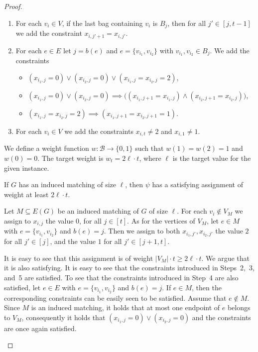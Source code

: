 \begin{proof}
\begin{enumerate}
        \item For each $v_i \in V$, if the last bag containing $v_i$ is $B_j$,
        then for all $j' \in [j,t-1]$ we add the constraint $x_{i,j'+1} = x_{i,j'}$.

        \item For each $e \in E$ let $j=b(e)$ and $e = \{v_{i_1}, v_{i_2}\}$ with $v_{i_1}, v_{i_2} \in B_j$.
        We add the constraints
        \begin{itemize}
            \item $(x_{i_1,j} = 0) \lor (x_{i_2,j} = 0) \lor (x_{i_1,j} = x_{i_2,j} = 2)$,
            \item $(x_{i_1,j} = 0) \lor (x_{i_2,j} = 0) \implies \big((x_{i_1,j+1} = x_{i_1,j}) \land (x_{i_2,j+1} = x_{i_2,j})\big)$,
            \item $(x_{i_1,j} = x_{i_2,j} = 2) \implies (x_{i_1,j+1} = x_{i_2,j+1} = 1)$.
        \end{itemize}

        \item For each $v_i \in V$ we add the constraints $x_{i,t} \neq 2$ and $x_{i,1} \neq 1$.
    \end{enumerate}

    We define a weight function $w \colon \mathcal{B} \to \{0,1\}$ such that
    $w(1) = w(2) = 1$ and $w(0) = 0$.
    The target weight is $w_t = 2\ell \cdot t$,
    where $\ell$ is the target value for the given {\InducedM} instance.

    \begin{claim}
        If $G$ has an induced matching of size $\ell$,
        then $\psi$ has a satisfying assignment of weight at least $2\ell \cdot t$.
    \end{claim}

    \begin{claimproof}
        Let $M \subseteq E(G)$ be an induced matching of $G$ of size $\ell$.
        For each $v_i \notin V_M$ we assign to $x_{i,j}$ the value $0$, for all $j \in [t]$.
        As for the vertices of $V_M$, let $e \in M$ with $e = \{v_{i_1},v_{i_2}\}$ and $b(e)=j$.
        Then we assign to both $x_{i_1,j'},x_{i_2,j'}$ the value $2$ for all $j' \in [j]$,
        and the value $1$ for all $j' \in [j+1,t]$.

        It is easy to see that this assignment is of weight $|V_M| \cdot t \ge 2\ell \cdot t$.
        We argue that it is also satisfying.
        It is easy to see that the constraints introduced in Steps~2,~3, and~5 are satisfied.
        To see that the constraints introduced in Step~4 are also satisfied,
        let $e \in E$ with $e = \{v_{i_1},v_{i_2}\}$ and $b(e)=j$.
        If $e \in M$, then the corresponding constraints can be easily seen to be satisfied.
        Assume that $e \notin M$.
        Since $M$ is an induced matching, it holds that at most one endpoint of $e$ belongs to $V_M$,
        consequently it holds that $(x_{i_1,j} = 0) \lor (x_{i_2,j} = 0)$ and the constraints are once
        again satisfied.
    \end{claimproof}


\end{proof}
